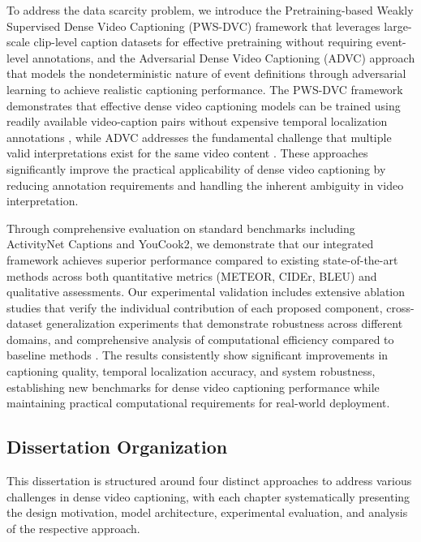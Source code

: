 To address the data scarcity problem, we introduce the Pretraining-based Weakly Supervised Dense Video Captioning (PWS-DVC) framework that leverages large-scale clip-level caption datasets for effective pretraining without requiring event-level annotations, and the Adversarial Dense Video Captioning (ADVC) approach that models the nondeterministic nature of event definitions through adversarial learning to achieve realistic captioning performance.
The PWS-DVC framework demonstrates that effective dense video captioning models can be trained using readily available video-caption pairs without expensive temporal localization annotations \cite{Huang2020-as, Luo2022-yq}, while ADVC addresses the fundamental challenge that multiple valid interpretations exist for the same video content \cite{Seo2022-ok, Yang2023-fm}.
These approaches significantly improve the practical applicability of dense video captioning by reducing annotation requirements and handling the inherent ambiguity in video interpretation.

Through comprehensive evaluation on standard benchmarks including ActivityNet Captions and YouCook2, we demonstrate that our integrated framework achieves superior performance compared to existing state-of-the-art methods across both quantitative metrics (METEOR, CIDEr, BLEU) and qualitative assessments.
Our experimental validation includes extensive ablation studies that verify the individual contribution of each proposed component, cross-dataset generalization experiments that demonstrate robustness across different domains, and comprehensive analysis of computational efficiency compared to baseline methods \cite{Krishna2017-pw, Zhou2018-zu, Wang2021-zi}.
The results consistently show significant improvements in captioning quality, temporal localization accuracy, and system robustness, establishing new benchmarks for dense video captioning performance while maintaining practical computational requirements for real-world deployment.


\subsection{Dissertation Organization}
\label{sec:dissertation_organization}

This dissertation is structured around four distinct approaches to address various challenges in dense video captioning, with each chapter systematically presenting the design motivation, model architecture, experimental evaluation, and analysis of the respective approach.

